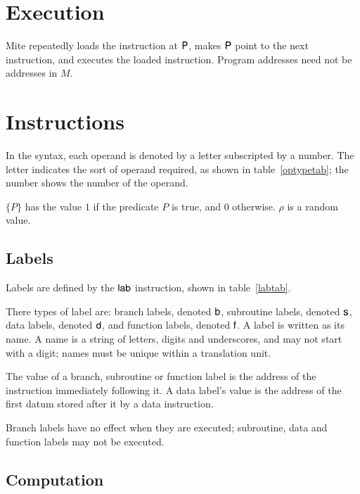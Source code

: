 \documentclass[english]{scrartcl}
\newcommand{\synfont}{\sffamily}
\newcommand{\syn}[1]{\ensuremath{\text{\synfont #1}}}
\newcommand{\insttab}[2]{\ctable[caption=#1]{>{\synfont}p{13ex}p{44ex}}{}{\FL #2\bottomrule}}
\begin{document}
\section{Execution}

Mite repeatedly loads the instruction at \syn{P}, makes \syn{P} point
to the next instruction, and executes the loaded instruction. Program
addresses need not be addresses in $M$.



\section{Instructions}

In the syntax, each operand is denoted by a letter subscripted by a
number. The letter indicates the sort of operand required, as shown in
table~\ref{optypetab}; the number shows the number of the operand.


$\{P\}$ has the value $1$ if the predicate $P$ is true, and $0$
otherwise. $\rho$ is a random value.


\subsection{Labels}

Labels are defined by the \syn{lab} instruction, shown in
table~\ref{labtab}.

\insttab{Label definition\label{labtab}}{}

There types of label are: branch labels, denoted \syn{b}, subroutine
labels, denoted \syn{s}, data labels, denoted \syn{d}, and function
labels, denoted \syn{f}. A label is written as its name. A name is a
string of letters, digits and underscores, and may not start with a
digit; names must be unique within a translation unit.

The value of a branch, subroutine or function label is the address of
the instruction immediately following it. A data label's value is the
address of the first datum stored after it by a data instruction.

Branch labels have no effect when they are executed; subroutine, data
and function labels may not be executed.


\subsection{Computation}
\end{document}
